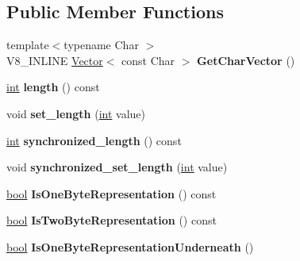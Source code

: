 \subsection*{Public Member Functions}
\begin{DoxyCompactItemize}
\item 
\mbox{\label{classv8_1_1internal_1_1String_a945956c945dbebd5028c08189ea3840d}} 
{\footnotesize template$<$typename Char $>$ }\\V8\+\_\+\+I\+N\+L\+I\+NE \mbox{\hyperlink{classv8_1_1internal_1_1Vector}{Vector}}$<$ const Char $>$ {\bfseries Get\+Char\+Vector} ()
\item 
\mbox{\label{classv8_1_1internal_1_1String_a4b9598664c07de8286fca05e8c16dc3d}} 
\mbox{\hyperlink{classint}{int}} {\bfseries length} () const
\item 
\mbox{\label{classv8_1_1internal_1_1String_aea8a5dad8c9c793594ea3f94c02e6402}} 
void {\bfseries set\+\_\+length} (\mbox{\hyperlink{classint}{int}} value)
\item 
\mbox{\label{classv8_1_1internal_1_1String_a357c94614288cf73d6fea399b65d3727}} 
\mbox{\hyperlink{classint}{int}} {\bfseries synchronized\+\_\+length} () const
\item 
\mbox{\label{classv8_1_1internal_1_1String_a70a34e89d4553f90cb58c268c3893433}} 
void {\bfseries synchronized\+\_\+set\+\_\+length} (\mbox{\hyperlink{classint}{int}} value)
\item 
\mbox{\label{classv8_1_1internal_1_1String_aa54319373b4da73b9068b5c434726b89}} 
\mbox{\hyperlink{classbool}{bool}} {\bfseries Is\+One\+Byte\+Representation} () const
\item 
\mbox{\label{classv8_1_1internal_1_1String_a34e5b17a87d1b2bb96855df97ac6d569}} 
\mbox{\hyperlink{classbool}{bool}} {\bfseries Is\+Two\+Byte\+Representation} () const
\item 
\mbox{\label{classv8_1_1internal_1_1String_a6abe0fd14db6ff4ce21e57a80bb9231d}} 
\mbox{\hyperlink{classbool}{bool}} {\bfseries Is\+One\+Byte\+Representation\+Underneath} ()

\end{DoxyCompactItemize}
